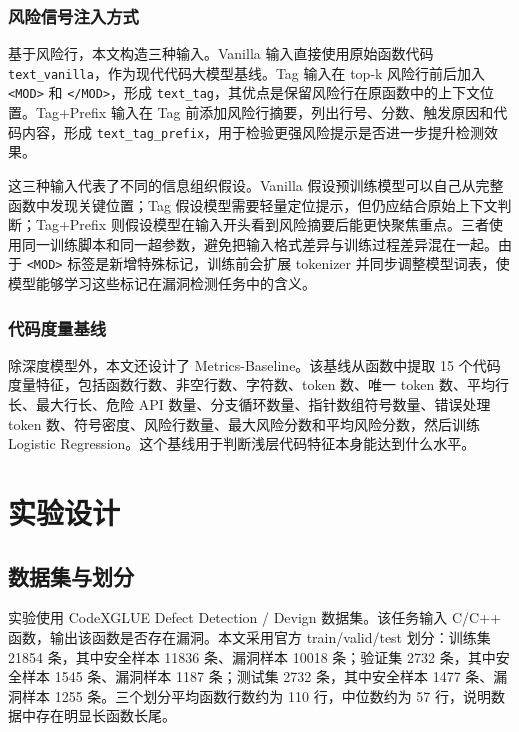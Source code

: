\documentclass[10pt]{article}
\newcommand{\modtag}{\texttt{\textless MOD\textgreater}}
\begin{document}
\subsubsection{风险信号注入方式}

基于风险行，本文构造三种输入。Vanilla 输入直接使用原始函数代码 \texttt{text\_vanilla}，作为现代代码大模型基线。Tag 输入在 top-k 风险行前后加入 \modtag{} 和 \texttt{\textless/MOD\textgreater}，形成 \texttt{text\_tag}，其优点是保留风险行在原函数中的上下文位置。Tag+Prefix 输入在 Tag 前添加风险行摘要，列出行号、分数、触发原因和代码内容，形成 \texttt{text\_tag\_prefix}，用于检验更强风险提示是否进一步提升检测效果。

这三种输入代表了不同的信息组织假设。Vanilla 假设预训练模型可以自己从完整函数中发现关键位置；Tag 假设模型需要轻量定位提示，但仍应结合原始上下文判断；Tag+Prefix 则假设模型在输入开头看到风险摘要后能更快聚焦重点。三者使用同一训练脚本和同一超参数，避免把输入格式差异与训练过程差异混在一起。由于 \modtag{} 标签是新增特殊标记，训练前会扩展 tokenizer 并同步调整模型词表，使模型能够学习这些标记在漏洞检测任务中的含义。

\subsubsection{代码度量基线}

除深度模型外，本文还设计了 Metrics-Baseline。该基线从函数中提取 15 个代码度量特征，包括函数行数、非空行数、字符数、token 数、唯一 token 数、平均行长、最大行长、危险 API 数量、分支循环数量、指针数组符号数量、错误处理 token 数、符号密度、风险行数量、最大风险分数和平均风险分数，然后训练 Logistic Regression。这个基线用于判断浅层代码特征本身能达到什么水平。

\section{实验设计}

\subsection{数据集与划分}

实验使用 CodeXGLUE Defect Detection / Devign 数据集\cite{lu2021codexglue}。该任务输入 C/C++ 函数，输出该函数是否存在漏洞。本文采用官方 train/valid/test 划分：训练集 21854 条，其中安全样本 11836 条、漏洞样本 10018 条；验证集 2732 条，其中安全样本 1545 条、漏洞样本 1187 条；测试集 2732 条，其中安全样本 1477 条、漏洞样本 1255 条。三个划分平均函数行数约为 110 行，中位数约为 57 行，说明数据中存在明显长函数长尾。
\end{document}
